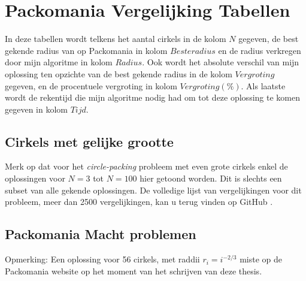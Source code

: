 \documentclass[12pt,a4paper,oneside]{book}
\begin{document}
{\chapter{Packomania Vergelijking Tabellen} \label{append:packomania-tabellen}

In deze tabellen wordt telkens het aantal cirkels in de kolom $N$ gegeven, de best gekende radius van op Packomania in kolom $Beste radius$ en de radius verkregen door mijn algoritme in kolom $Radius$.
Ook wordt het absolute verschil van mijn oplossing ten opzichte van de best gekende radius in de kolom $Vergroting$ gegeven, en de procentuele vergroting in kolom $Vergroting (\%)$.
Als laatste wordt de rekentijd die mijn algoritme nodig had om tot deze oplossing te komen gegeven in kolom $Tijd$.

\section{Cirkels met gelijke grootte} \label{append:packomania-tabellen-gelijke-grootte}

Merk op dat voor het \textit{circle-packing} probleem met even grote cirkels enkel de oplossingen voor $N=3$ tot $N=100$ hier getoond worden.
Dit is slechts een subset van alle gekende oplossingen.
De volledige lijst van vergelijkingen voor dit probleem, meer dan 2500 vergelijkingen, kan u terug vinden op GitHub \cite{packomania-tables-github}.

 \label{table:packomania-equal}

\section{Packomania Macht problemen} \label{append:packomania-tabellen-macht}

 \label{table:packomania-i}

 \label{table:packomania-i^1/2}

 \label{table:packomania-i^-1/5}

 \label{table:packomania-i^-1/2}

 \label{table:packomania-i^-2/3}

Opmerking: Een oplossing voor 56 cirkels, met raddii $r_i=i^{-2/3}$ miste op de Packomania website op het moment van het schrijven van deze thesis.

}
\end{document}
